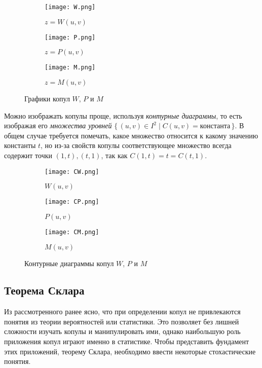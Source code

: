 \begin{figure}[H]
	\centering
	\begin{subfigure}{.5\textwidth}
		\centering
		\texttt{[image: W.png]}
		\caption{$z = W(u, v)$}
	\end{subfigure}%
	\begin{subfigure}{.5\textwidth}
		\centering
		\texttt{[image: P.png]}
		\caption{$z = P(u, v)$}
	\end{subfigure}
	\begin{subfigure}{.5\textwidth}
		\centering
		\texttt{[image: M.png]}
		\caption{$z = M(u, v)$}
	\end{subfigure}
	\caption{Графики копул $W$, $P$ и $M$}
\end{figure}

Можно изображать копулы проще, используя \emph{контурные диаграммы}, то есть изображая его \emph{множества уровней} $\{\, (u, v) \in I^2 \mid C(u, v) = \text{константа} \,\}$. В общем случае требуется помечать, какое множество относится к какому значению константы $t$, но из-за свойств копулы соответствующее множество всегда содержит точки $(1, t), (t, 1)$, так как $C(1, t) = t = C(t, 1)$.

\begin{figure}[H]
	\centering
	\begin{subfigure}{.3\textwidth}
		\centering
		\texttt{[image: CW.png]}
		\caption{$W(u, v)$}
	\end{subfigure}%
	\begin{subfigure}{.3\textwidth}
		\centering
		\texttt{[image: CP.png]}
		\caption{$P(u, v)$}
	\end{subfigure}
	\begin{subfigure}{.3\textwidth}
		\centering
		\texttt{[image: CM.png]}
		\caption{$M(u, v)$}
	\end{subfigure}
	\caption{Контурные диаграммы копул $W$, $P$ и $M$}
\end{figure}
\subsection*{Теорема Склара}

Из рассмотренного ранее ясно, что при определении копул не привлекаются понятия из теории вероятностей или статистики. Это позволяет без лишней сложности изучать копулы и манипулировать ими, однако наибольшую роль приложения копул играют именно в статистике. Чтобы представить фундамент этих приложений, теорему Склара, необходимо ввести некоторые стохастические понятия.

